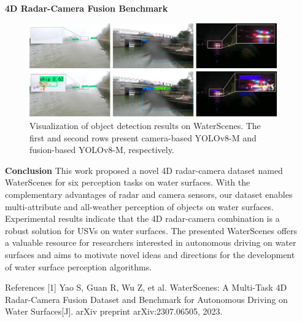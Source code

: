 \documentclass[final]{beamer}
\newlength{\sepwidthB}
\newlength{\colwidthB}
\newcommand{\separatorcolumnB}{\begin{column}{\sepwidthB}\end{column}}
\begin{document}
\begin{frame}[t]
\begin{columns}
\begin{column}[T]{\colwidthB}
\begin{block}{\Large{\textbf{4D Radar-Camera Fusion Benchmark}}}
\begin{figure}[htbp]
\centering
\includegraphics[width=0.95\columnwidth]{images/visualization}
\caption{Visualization of object detection results on WaterScenes. The first and second rows present camera-based YOLOv8-M and fusion-based YOLOv8-M, respectively.}
\end{figure}
\end{block}

\vspace{-0.5cm}
\begin{block}{\Large{\textbf{Conclusion}}}
\vspace{0.9cm}
\large
This work proposed a novel 4D radar-camera dataset named WaterScenes for six perception tasks on water surfaces. 
With the complementary advantages of radar and camera sensors, our dataset enables multi-attribute and all-weather perception of objects on water surfaces. 
Experimental results indicate that the 4D radar-camera combination is a robust solution for USVs on water surfaces. 
The presented WaterScenes offers a valuable resource for researchers interested in autonomous driving on water surfaces and aims to motivate novel ideas and directions for the development of water surface perception algorithms. 
\end{block}

\vspace{-0.5cm}
\begin{block}{\large{References}}
\vspace{0.5cm}
\normalsize
[1] Yao S, Guan R, Wu Z, et al. WaterScenes: A Multi-Task 4D Radar-Camera Fusion Dataset and Benchmark for Autonomous Driving on Water Surfaces[J]. arXiv preprint arXiv:2307.06505, 2023.
\end{block}

\end{column}
\separatorcolumnB
\end{columns}
\end{frame}
\end{document}
